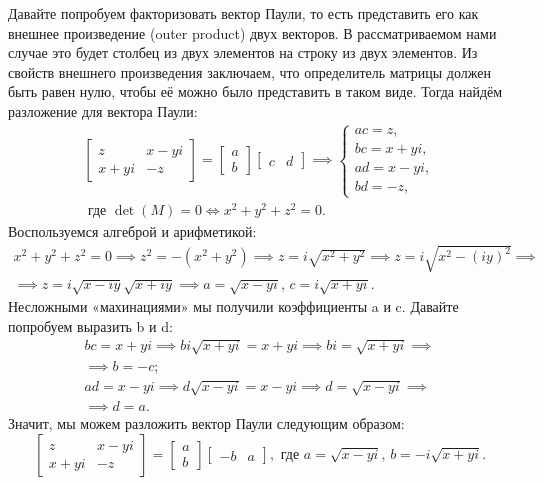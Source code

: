 Давайте попробуем факторизовать вектор Паули, то есть представить его как
внешнее произведение (outer product) двух векторов. В рассматриваемом нами
случае это будет столбец из двух элементов на строку из двух элементов. Из
свойств внешнего произведения заключаем, что определитель матрицы должен быть
равен нулю, чтобы её можно было представить в таком виде. Тогда найдём
разложение для вектора Паули:
\begin{gather*}
  \begin{bmatrix} z & x-yi\\ x + yi & -z \end{bmatrix} = \begin{bmatrix} a \\ b \end{bmatrix}\begin{bmatrix} c & d \end{bmatrix} \implies \begin{cases} ac = z, \\ bc = x + yi, \\ ad = x - yi, \\ bd = -z, \end{cases} \\
  \text{ где } \det(M) = 0 \Longleftrightarrow x^2 + y^2 + z^2 = 0.
\end{gather*}
Воспользуемся алгеброй и арифметикой:
\begin{gather*}
  x^2 + y^2 + z^2 = 0 \implies z^2 = -(x^2 + y^2) \implies z = i\sqrt{x^2 + y^2} \implies z = i\sqrt{x^2 - (iy)^2} \implies \\ \implies z = i\sqrt{x-iy}\sqrt{x+iy} \implies a = \sqrt{x-yi},\, c = i\sqrt{x+yi}.
\end{gather*}
Несложными «махинациями» мы получили коэффициенты a и c. Давайте попробуем
выразить b и d:
\begin{gather*}
  bc = x + yi \implies b i\sqrt{x+yi} = x + yi \implies bi = \sqrt{x+yi} \implies \\ \implies b = -c; \\
  ad = x - yi \implies d\sqrt{x-yi} = x - yi \implies d = \sqrt{x - yi} \implies \\ \implies d = a.
\end{gather*}
Значит, мы можем разложить вектор Паули следующим образом:
\[
  \begin{bmatrix} z & x-yi\\ x + yi & -z \end{bmatrix} = \begin{bmatrix} a \\ b \end{bmatrix}\begin{bmatrix} -b & a \end{bmatrix}, \text{ где } a = \sqrt{x-yi},\, b = -i\sqrt{x+yi}.
\]
